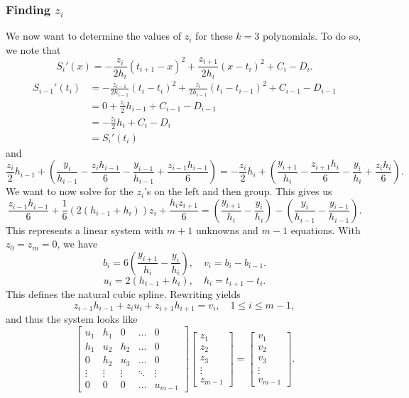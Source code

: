 \documentclass[letterpaper]{article}
\begin{document}
\subsubsection{Finding \texorpdfstring{$z_i$}{z-Coefficients}}
We now want to determine the values of $z_i$ for these $k = 3$ polynomials. To do so, we note that 
\[S_{i}'(x) = -\frac{z_i}{2h_i}(t_{i + 1} - x)^2 + \frac{z_{i + 1}}{2h_i}(x - t_i)^2 + C_i - D_i.\]
\[\begin{aligned}
    S_{i - 1}'(t_i) &= -\frac{z_{i - 1}}{2h_{i - 1}}(t_{i} - t_i)^2 + \frac{z_{i}}{2h_{i - 1}}(t_i - t_{i - 1})^2 + C_{i - 1} - D_{i - 1} \\ 
        &= 0 + \frac{z_{i}}{2}h_{i - 1} + C_{i - 1} - D_{i - 1} \\
        &= -\frac{z_i}{2} h_i + C_i - D_i \\ 
        &= S_{i}'(t_i)
\end{aligned}\]
and
\[\frac{z_{i}}{2} h_{i - 1} + \left(\frac{y_i}{h_{i - 1}} - \frac{z_i h_{i - 1}}{6} - \frac{y_{i - 1}}{h_{i - 1}} + \frac{z_{i - 1} h_{i - 1}}{6}\right) = -\frac{z_i}{2}h_i + \left(\frac{y_{i + 1}}{h_i} -\frac{z_{i + 1}h_i}{6} - \frac{y_i}{h_i} + \frac{z_i h_i}{6}\right).\]
We want to now solve for the $z_i$'s on the left and then group. This gives us 
\[\frac{z_{i - 1}h_{i - 1}}{6} + \frac{1}{6}\left(2(h_{i - 1} + h_i)\right)z_i + \frac{h_i z_{i + 1}}{6} = \left(\frac{y_{i + 1}}{h_i} - \frac{y_i}{h_i}\right) - \left(\frac{y_i}{h_{i - 1}} - \frac{y_{i - 1}}{h_{i - 1}}\right).\]
This represents a linear system with $m + 1$ unknowns and $m - 1$ equations. With $z_0 = z_m = 0$, we have 
\[b_i = 6\left(\frac{y_{i + 1}}{h_i} - \frac{y_i}{h_i}\right), \quad v_i = b_i - b_{i - 1}.\]
\[u_i = 2(h_{i - 1} + h_i), \quad h_i = t_{i + 1} - t_i.\]
This defines the natural cubic spline. Rewriting yields 
\[z_{i - 1}h_{i - 1} + z_i u_i + z_{i + 1} h_{i + 1} = v_i, \quad 1 \leq i \leq m - 1,\]
and thus the system looks like 
\[\begin{bmatrix}
    u_1 & h_1 & 0 & \hdots & 0 \\ 
    h_1 & u_2 & h_2 & \hdots & 0 \\ 
    0 & h_2 & u_3 & \hdots & 0 \\ 
    \vdots & \vdots & \vdots & \ddots & \vdots \\ 
    0 & 0 & 0 & \hdots & u_{m - 1}
\end{bmatrix} \begin{bmatrix}
    z_1 \\ z_2 \\ z_3 \\ \vdots \\ z_{m - 1}
\end{bmatrix} = \begin{bmatrix}
    v_1 \\ v_2 \\ v_3 \\ \vdots \\ v_{m - 1}
\end{bmatrix}.\]
\end{document}
